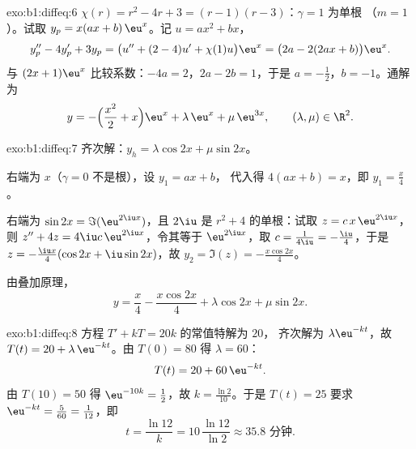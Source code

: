 \begin{solution}{exo:b1:diffeq:6}
$\chi(r) = r^2 - 4r + 3 = (r-1)(r-3)$：$\gamma = 1$ 为单根
（$m = 1$）。试取 $y_p = x(ax + b)\,\eu^x$。记 $u = ax^2 + bx$，
\[
y_p'' - 4y_p' + 3y_p = \bigl(u'' + (2 - 4)u' + \chi(1) u\bigr)\eu^x
= \bigl(2a - 2(2ax + b)\bigr)\eu^x .
\]
与 $(2x + 1)\eu^x$ 比较系数：$-4a = 2$，$2a - 2b = 1$，于是 $a =
-\frac12$，$b = -1$。通解为
\[
y = -\Bigl(\frac{x^2}{2} + x\Bigr)\eu^{x} + \lambda\,\eu^{x} +
\mu\,\eu^{3x}, \qquad (\lambda, \mu) \in \R^2 .
\]
\end{solution}

\begin{solution}{exo:b1:diffeq:7}
齐次解：$y_h = \lambda\cos 2x + \mu\sin 2x$。

右端为 $x$（$\gamma = 0$ 不是根），设 $y_1 = ax + b$，
代入得 $4(ax + b) = x$，即 $y_1 = \frac x4$。

右端为 $\sin 2x = \Im(\eu^{2\iu x})$，且 $2\iu$ 是
$r^2 + 4$ 的单根：试取 $z = c\,x\,\eu^{2\iu x}$，则 $z'' + 4z =
4\iu c\,\eu^{2\iu x}$，令其等于 $\eu^{2\iu x}$，取 $c =
\frac{1}{4\iu} = -\frac{\iu}{4}$，于是 $z = -\frac{\iu x}{4}(\cos 2x +
\iu \sin 2x)$，故 $y_2 = \Im(z) = -\frac{x\cos 2x}{4}$。

由叠加原理，
\[
y = \frac{x}{4} - \frac{x\cos 2x}{4} + \lambda\cos 2x + \mu\sin 2x .
\]
\end{solution}

\begin{solution}{exo:b1:diffeq:8}
方程 $T' + kT = 20k$ 的常值特解为 $20$，
齐次解为 $\lambda\eu^{-kt}$，故 $T(t) = 20 +
\lambda\,\eu^{-kt}$。由 $T(0) = 80$ 得 $\lambda = 60$：
\[
T(t) = 20 + 60\,\eu^{-kt} .
\]
由 $T(10) = 50$ 得 $\eu^{-10k} = \frac12$，故 $k = \frac{\ln 2}{10}$。于是
$T(t) = 25$ 要求 $\eu^{-kt} = \frac{5}{60} = \frac{1}{12}$，即
\[
t = \frac{\ln 12}{k} = 10\,\frac{\ln 12}{\ln 2} \approx 35.8
\text{ 分钟.}
\]
\end{solution}

